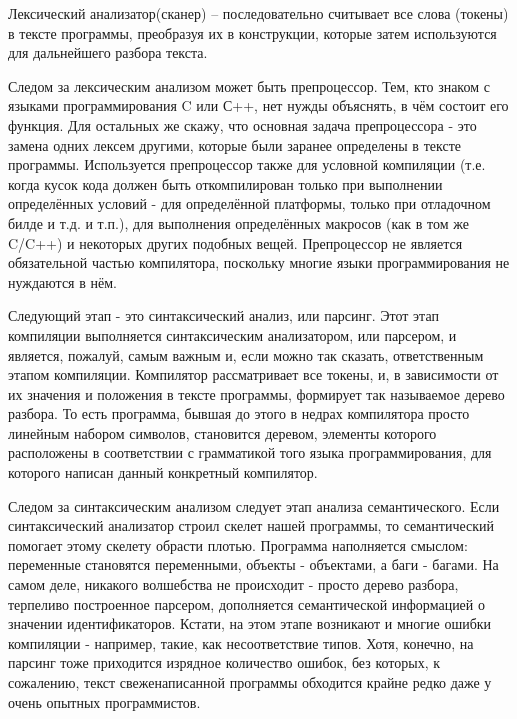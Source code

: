 \documentclass{article}
\begin{document}
Лексический анализатор(сканер) -- последовательно считывает все слова (токены) в тексте программы, преобразуя их в конструкции, которые затем используются для дальнейшего разбора текста.

Следом за лексическим анализом может быть препроцессор. Тем, кто знаком с языками программирования C или С++, нет нужды объяснять, в чём состоит его функция. Для остальных же скажу, что основная задача препроцессора - это замена одних лексем другими, которые были заранее определены в тексте программы. Используется препроцессор также для условной компиляции (т.е. когда кусок кода должен быть откомпилирован только при выполнении определённых условий - для определённой платформы, только при отладочном билде и т.д. и т.п.), для выполнения определённых макросов (как в том же C/C++) и некоторых других подобных вещей. Препроцессор не является обязательной частью компилятора, поскольку многие языки программирования не нуждаются в нём.

Следующий этап - это синтаксический анализ, или парсинг. Этот этап компиляции выполняется синтаксическим анализатором, или парсером, и является, пожалуй, самым важным и, если можно так сказать, ответственным этапом компиляции. Компилятор рассматривает все токены, и, в зависимости от их значения и положения в тексте программы, формирует так называемое дерево разбора. То есть программа, бывшая до этого в недрах компилятора просто линейным набором символов, становится деревом, элементы которого расположены в соответствии с грамматикой того языка программирования, для которого написан данный конкретный компилятор.

Следом за синтаксическим анализом следует этап анализа семантического. Если синтаксический анализатор строил скелет нашей программы, то семантический помогает этому скелету обрасти плотью. Программа наполняется смыслом: переменные становятся переменными, объекты - объектами, а баги - багами. На самом деле, никакого волшебства не происходит - просто дерево разбора, терпеливо построенное парсером, дополняется семантической информацией о значении идентификаторов. Кстати, на этом этапе возникают и многие ошибки компиляции - например, такие, как несоответствие типов. Хотя, конечно, на парсинг тоже приходится изрядное количество ошибок, без которых, к сожалению, текст свеженаписанной программы обходится крайне редко даже у очень опытных программистов.
\end{document}
